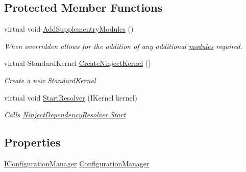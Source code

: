 \subsection*{Protected Member Functions}
\begin{DoxyCompactItemize}
\item 
virtual void \hyperlink{classCqrs_1_1Ninject_1_1Configuration_1_1SimplifiedNinjectStartUp_a481f691fbc1eec3f793a3b5769d83e5c_a481f691fbc1eec3f793a3b5769d83e5c}{Add\+Supplementry\+Modules} ()
\begin{DoxyCompactList}\small\item\em When overridden allows for the addition of any additional \hyperlink{}{modules} required. \end{DoxyCompactList}\item 
virtual Standard\+Kernel \hyperlink{classCqrs_1_1Ninject_1_1Configuration_1_1SimplifiedNinjectStartUp_a4a503b092601f347cfe320e3b6f1d26e_a4a503b092601f347cfe320e3b6f1d26e}{Create\+Ninject\+Kernel} ()
\begin{DoxyCompactList}\small\item\em Create a new Standard\+Kernel \end{DoxyCompactList}\item 
virtual void \hyperlink{classCqrs_1_1Ninject_1_1Configuration_1_1SimplifiedNinjectStartUp_a4f7b687c63d3fed34ddd9d3d1ecae6aa_a4f7b687c63d3fed34ddd9d3d1ecae6aa}{Start\+Resolver} (I\+Kernel kernel)
\begin{DoxyCompactList}\small\item\em Calls \hyperlink{classCqrs_1_1Ninject_1_1Configuration_1_1NinjectDependencyResolver_adc6171ed45679dcbaa67782770ba5083_adc6171ed45679dcbaa67782770ba5083}{Ninject\+Dependency\+Resolver.\+Start} \end{DoxyCompactList}\end{DoxyCompactItemize}
\subsection*{Properties}
\begin{DoxyCompactItemize}
\item 
\hyperlink{interfaceCqrs_1_1Configuration_1_1IConfigurationManager}{I\+Configuration\+Manager} \hyperlink{classCqrs_1_1Ninject_1_1Configuration_1_1SimplifiedNinjectStartUp_ae47357929d5c42f602a97e6b5dd6b0c4_ae47357929d5c42f602a97e6b5dd6b0c4}{Configuration\+Manager}
\end{DoxyCompactItemize}


